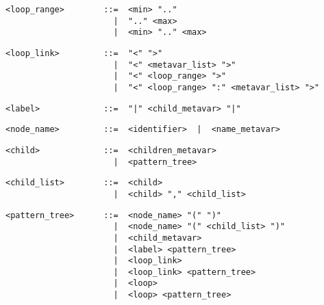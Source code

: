 \begin{small}\begin{verbatim}
<loop_range>        ::=  <min> ".."
                      |  ".." <max>
                      |  <min> ".." <max>
\end{verbatim}\end{small}

\begin{small}\begin{verbatim}
<loop_link>         ::=  "<" ">"
                      |  "<" <metavar_list> ">"
                      |  "<" <loop_range> ">"
                      |  "<" <loop_range> ":" <metavar_list> ">"
\end{verbatim}\end{small}

\begin{small}\begin{verbatim}
<label>             ::=  "|" <child_metavar> "|"
\end{verbatim}\end{small}

\begin{small}\begin{verbatim}
<node_name>         ::=  <identifier>  |  <name_metavar>
\end{verbatim}\end{small}

\begin{small}\begin{verbatim}
<child>             ::=  <children_metavar>
                      |  <pattern_tree>
\end{verbatim}\end{small}

\begin{small}\begin{verbatim}
<child_list>        ::=  <child>
                      |  <child> "," <child_list>
\end{verbatim}\end{small}

\begin{small}\begin{verbatim}
<pattern_tree>      ::=  <node_name> "(" ")"
                      |  <node_name> "(" <child_list> ")"
                      |  <child_metavar>
                      |  <label> <pattern_tree>
                      |  <loop_link>
                      |  <loop_link> <pattern_tree>
                      |  <loop>
                      |  <loop> <pattern_tree>
\end{verbatim}\end{small}

